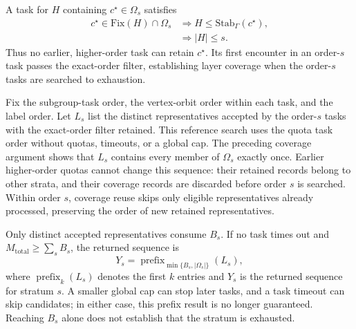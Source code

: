 \documentclass[a5paper, 10pt]{article}
\begin{document}
A task for $H$ containing $c^\star\in\Omega_s$ satisfies
\begin{equation}
\begin{aligned}
c^\star\in\mathrm{Fix}(H)\cap\Omega_s
&\Longrightarrow H\leq\mathrm{Stab}_{\Gamma}(c^\star),\\
&\Longrightarrow |H|\leq s.
\end{aligned}
\label{eq:quota_layer_order}
\end{equation}
Thus no earlier, higher-order task can retain $c^\star$. Its first encounter in an order-$s$ task passes the exact-order filter, establishing layer coverage when the order-$s$ tasks are searched to exhaustion.

Fix the subgroup-task order, the vertex-orbit order within each task, and the label order. Let $L_s$ list the distinct representatives accepted by the order-$s$ tasks with the exact-order filter retained. This reference search uses the quota task order without quotas, timeouts, or a global cap. The preceding coverage argument shows that $L_s$ contains every member of $\Omega_s$ exactly once. Earlier higher-order quotas cannot change this sequence: their retained records belong to other strata, and their coverage records are discarded before order $s$ is searched. Within order $s$, coverage reuse skips only eligible representatives already processed, preserving the order of new retained representatives.

Only distinct accepted representatives consume $B_s$. If no task times out and $M_{\mathrm{total}}\geq\sum_s B_s$, the returned sequence is
\begin{equation}
Y_s=\operatorname{prefix}_{\min\{B_s,|\Omega_s|\}}(L_s),
\label{eq:quota_prefix}
\end{equation}
where $\operatorname{prefix}_k(L_s)$ denotes the first $k$ entries and $Y_s$ is the returned sequence for stratum $s$. A smaller global cap can stop later tasks, and a task timeout can skip candidates; in either case, this prefix result is no longer guaranteed. Reaching $B_s$ alone does not establish that the stratum is exhausted.
\end{document}
